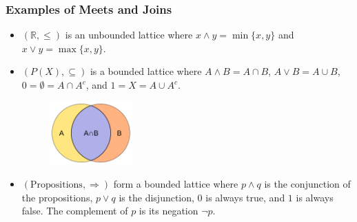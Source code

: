 \documentclass{beamer}
\begin{document}
\begin{frame}

	\frametitle{Examples of Meets and Joins}
	
	\begin{example}
	
		\begin{itemize}
		
			\item $(\mathbb{R},\leq)$ is an unbounded lattice where $x\wedge y=\min\{x,y\}$ and $x\vee y=\max\{x,y\}$.
		
			\item $(P(X),\subseteq)$ is a bounded lattice where $A\wedge B=A\cap B$, $A\vee B=A\cup B$, $0=\emptyset=A\cap A^c$, and $1=X=A\cup A^c$.
			
			\begin{figure}
			\includegraphics[width=0.3\textwidth]{intersection_of_sets_A_and_B.png}
			\end{figure}		
			
			\item $(\text{Propositions},\Rightarrow)$ form a bounded lattice where $p\wedge q$ is the conjunction of the propositions, $p\vee q$ is the disjunction, $0$ is always true, and $1$ is always false. The complement of $p$ is its negation $\neg p$.
		
		\end{itemize}			
	
	\end{example}

\end{frame}
\end{document}
